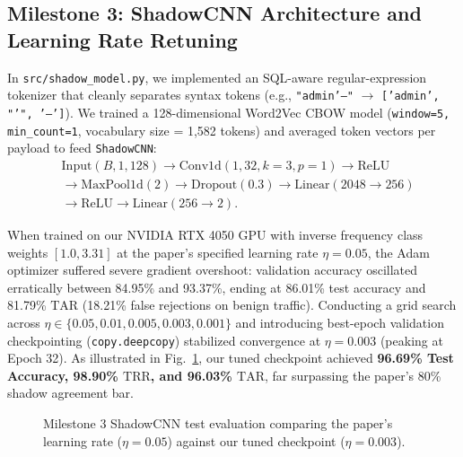 \documentclass[conference]{IEEEtran}
\newcommand{\TRR}{\ensuremath{\mathrm{TRR}}}
\newcommand{\TAR}{\ensuremath{\mathrm{TAR}}}
\begin{document}
\subsection{Milestone 3: ShadowCNN Architecture and Learning Rate Retuning}
In \texttt{src/shadow\_model.py}, we implemented an SQL-aware regular-expression tokenizer that cleanly separates syntax tokens (e.g., \texttt{"admin'--"} $\to$ \texttt{['admin', "'", '--']}). We trained a 128-dimensional Word2Vec CBOW model (\texttt{window=5, min\_count=1}, vocabulary size = 1,582 tokens) and averaged token vectors per payload to feed \texttt{ShadowCNN}:
\begin{align*}
&\text{Input}(B,1,128) \to \text{Conv1d}(1,32,k=3,p=1) \to \text{ReLU} \\
&\to \text{MaxPool1d}(2) \to \text{Dropout}(0.3) \to \text{Linear}(2048 \to 256) \\
&\to \text{ReLU} \to \text{Linear}(256 \to 2).
\end{align*}

When trained on our NVIDIA RTX 4050 GPU with inverse frequency class weights $[1.0, 3.31]$ at the paper's specified learning rate $\eta = 0.05$, the Adam optimizer suffered severe gradient overshoot: validation accuracy oscillated erratically between 84.95\% and 93.37\%, ending at 86.01\% test accuracy and 81.79\% \TAR{} (18.21\% false rejections on benign traffic). Conducting a grid search across $\eta \in \{0.05, 0.01, 0.005, 0.003, 0.001\}$ and introducing best-epoch validation checkpointing (\texttt{copy.deepcopy}) stabilized convergence at $\eta = 0.003$ (peaking at Epoch 32). As illustrated in Fig.~\ref{fig:lr}, our tuned checkpoint achieved \textbf{96.69\% Test Accuracy, 98.90\% \TRR{}, and 96.03\% \TAR{}}, far surpassing the paper's 80\% shadow agreement bar.

\begin{figure}[t]
\centering
{}
\caption{Milestone 3 ShadowCNN test evaluation comparing the paper's learning rate ($\eta=0.05$) against our tuned checkpoint ($\eta=0.003$).}
\label{fig:lr}
\end{figure}
\end{document}
